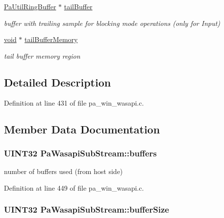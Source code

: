\begin{DoxyCompactItemize}
\hyperlink{struct_pa_util_ring_buffer}{Pa\+Util\+Ring\+Buffer} $\ast$ \hyperlink{struct_pa_wasapi_sub_stream_adf3195bb40b64f9415239817b7342793}{tail\+Buffer}
\begin{DoxyCompactList}\small\item\em buffer with trailing sample for blocking mode operations (only for Input) \end{DoxyCompactList}\item 
\hyperlink{sound_8c_ae35f5844602719cf66324f4de2a658b3}{void} $\ast$ \hyperlink{struct_pa_wasapi_sub_stream_af13270a12d88b5a79a3f2929783a0611}{tail\+Buffer\+Memory}
\begin{DoxyCompactList}\small\item\em tail buffer memory region \end{DoxyCompactList}\end{DoxyCompactItemize}


\subsection{Detailed Description}


Definition at line 431 of file pa\+\_\+win\+\_\+wasapi.\+c.



\subsection{Member Data Documentation}
\subsubsection[{\texorpdfstring{buffers}{buffers}}]{\setlength{\rightskip}{0pt plus 5cm}U\+I\+N\+T32 Pa\+Wasapi\+Sub\+Stream\+::buffers}\hypertarget{struct_pa_wasapi_sub_stream_ac2fc3d1d317aa761577e2dc2ca782b97}{}\label{struct_pa_wasapi_sub_stream_ac2fc3d1d317aa761577e2dc2ca782b97}


number of buffers used (from host side) 



Definition at line 449 of file pa\+\_\+win\+\_\+wasapi.\+c.

\subsubsection[{\texorpdfstring{buffer\+Size}{bufferSize}}]{\setlength{\rightskip}{0pt plus 5cm}U\+I\+N\+T32 Pa\+Wasapi\+Sub\+Stream\+::buffer\+Size}\hypertarget{struct_pa_wasapi_sub_stream_ae3cbfddfe0db9949574f9ca11d7708fc}{}\label{struct_pa_wasapi_sub_stream_ae3cbfddfe0db9949574f9ca11d7708fc}


